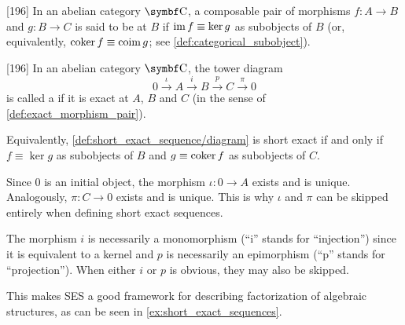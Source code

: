 \begin{definition}\label{def:exact_morphism_pair}\cite{MacLane1994}[196]
  In an abelian category \( \Bold C \), a composable pair of morphisms \( f: A \to B \) and \( g: B \to C \) is said to be  at \( B \) if \( \operatorname{im} f \equiv \ker g \) as subobjects of \( B \) (or, equivalently, \( \operatorname{co}\!\ker f \equiv \operatorname{co}\!\operatorname{im} g \); see \cref{def:categorical_subobject}).
\end{definition}

\begin{definition}\label{def:short_exact_sequence}\cite{MacLane1994}[196]
  In an abelian category \( \Bold C \), the tower diagram
  \begin{equation}\label{def:short_exact_sequence/diagram}
    0
    \overset \iota \longrightarrow
    A
    \overset i \longrightarrow
    B
    \overset p \longrightarrow
    C
    \overset \pi \longrightarrow
    0
  \end{equation}
  is called a  if it is exact at \( A \), \( B \) and \( C \) (in the sense of \cref{def:exact_morphism_pair}).

  Equivalently, \cref{def:short_exact_sequence/diagram} is short exact if and only if \( f \equiv \ker g \) as subobjects of \( B \) and \( g \equiv \operatorname{co}\!\ker f \) as subobjects of \( C \).
\end{definition}

\begin{remark}\label{remark:short_exact_sequence_factorization}
  Since \( 0 \) is an initial object, the morphism \( \iota: 0 \to A \) exists and is unique. Analogously, \( \pi: C \to 0 \) exists and is unique. This is why \( \iota \) and \( \pi \) can be skipped entirely when defining short exact sequences.

  The morphism \( i \) is necessarily a monomorphism (\enquote{i} stands for \enquote{injection}) since it is equivalent to a kernel and \( p \) is necessarily an epimorphism (\enquote{p} stands for \enquote{projection}). When either \( i \) or \( p \) is obvious, they may also be skipped.

  This makes SES a good framework for describing factorization of algebraic structures, as can be seen in \cref{ex:short_exact_sequences}.
\end{remark}

